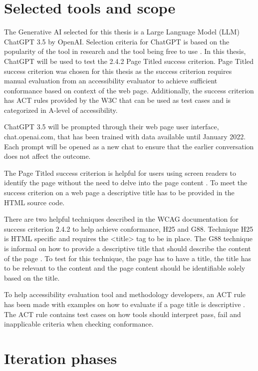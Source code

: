 \section{Selected tools and scope}

The Generative AI selected for this thesis is a Large Language Model (LLM) ChatGPT 3.5 by OpenAI. Selection criteria for ChatGPT is based on the popularity of the tool in research and the tool being free to use \citep{ouyang2023llm, white2023prompt}. In this thesis, ChatGPT will be used to test the 2.4.2 Page Titled success criterion. Page Titled success criterion was chosen for this thesis as the success criterion requires manual evaluation from an accessibility evaluator to achieve sufficient conformance based on context of the web page. Additionally, the success criterion has ACT rules provided by the W3C that can be used as test cases and is categorized in A-level of accessibility. 

ChatGPT 3.5 will be prompted through their web page user interface, chat.openai.com, that has been trained with data available until January 2022. Each prompt will be opened as a new chat to ensure that the earlier conversation does not affect the outcome.

The Page Titled success criterion is helpful for users using screen readers to identify the page without the need to delve into the page content \citep{wcag_page_titled}. To meet the success criterion on a web page a descriptive title has to be provided in the HTML source code. 

There are two helpful techniques described in the WCAG documentation for success criterion 2.4.2 to help achieve conformance, H25 and G88. Technique H25 is HTML specific and requires the <title> tag to be in place. The G88 technique is informal on how to provide a descriptive title that should describe the content of the page \citep{g88}. To test for this technique, the page has to have a title, the title has to be relevant to the content and the page content should be identifiable solely based on the title.

To help accessibility evaluation tool and methodology developers, an ACT rule has been made with examples on how to evaluate if a page title is descriptive \citep{act_rule_g88}. The ACT rule contains test cases on how tools should interpret pass, fail and inapplicable criteria when checking conformance. 

\section{Iteration phases}

